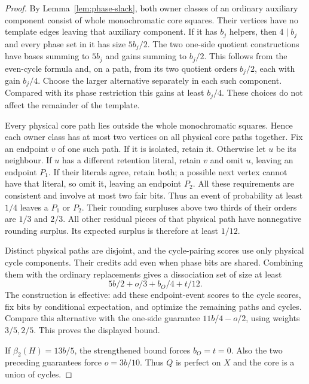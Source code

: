 \documentclass[11pt]{article}
\newcommand{\diss}{\beta_2}
\begin{document}
\begin{proof}
By Lemma~\ref{lem:phase-slack}, both owner classes of an ordinary
auxiliary component consist of whole monochromatic core squares.
Their vertices have no template edges leaving that auxiliary component.
If it has $b_j$ helpers, then $4\mid b_j$ and every phase set in it
has size $5b_j/2$. The two one-side quotient constructions have bases
summing to $5b_j$ and gains summing to $b_j/2$. This follows from
the even-cycle formula and, on a path, from its two quotient orders
$b_j/2$, each with gain $b_j/4$.
Choose the larger alternative separately in each such component.
Compared with its phase restriction this gains at least $b_j/4$.
These choices do not affect the remainder of the template.

Every physical core path lies outside the whole monochromatic
squares. Hence each owner class has at most two vertices on all
physical core paths together. Fix an endpoint $v$ of one such path.
If it is isolated, retain it. Otherwise let $u$ be its neighbour.
If $u$ has a different retention literal, retain $v$ and omit $u$,
leaving an endpoint $P_1$. If their literals agree, retain both;
a possible next vertex cannot have that literal, so omit it,
leaving an endpoint $P_2$. All these requirements are consistent
and involve at most two fair bits. Thus an event of probability
at least $1/4$ leaves a $P_1$ or $P_2$. Their rounding surpluses
above two thirds of their orders are $1/3$ and $2/3$.
All other residual pieces of that physical path have nonnegative
rounding surplus. Its expected surplus is therefore at least $1/12$.

Distinct physical paths are disjoint, and the cycle-pairing scores
use only physical cycle components. Their credits add even when
phase bits are shared. Combining them with the ordinary replacements
gives a dissociation set of size at least
\[
 5b/2+o/3+b_O/4+t/12.
\]
The construction is effective: add these endpoint-event scores to
the cycle scores, fix bits by conditional expectation, and optimize
the remaining paths and cycles. Compare this alternative with the
one-side guarantee $11b/4-o/2$, using weights $3/5,2/5$.
This proves the displayed bound.

If $\diss(H)=13b/5$, the strengthened bound forces $b_O=t=0$.
Also the two preceding guarantees force $o=3b/10$.
Thus $Q$ is perfect on $X$ and the core is a union of cycles.
\end{proof}
\end{document}
